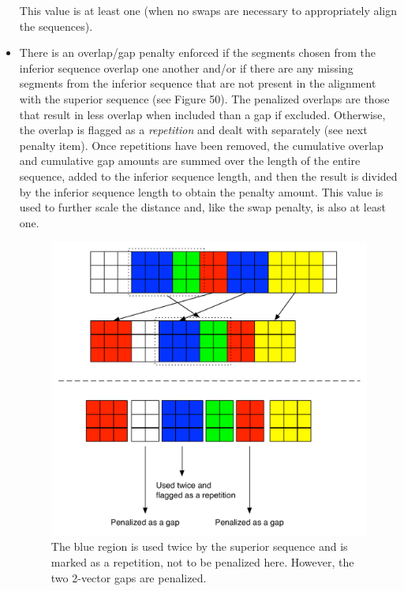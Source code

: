 \documentclass[12pt]{report} 	%
\numberwithin{figure}{chapter}
\numberwithin{table}{chapter}
\numberwithin{equation}{chapter}
\begin{document}
\begin{flushleft}
\begin{itemize}
\begin{figure}[h!]
\begin{center}
\end{center}
\end{figure}
This value is at least one (when no swaps are necessary to appropriately align the sequences). 
\item There is an overlap/gap penalty enforced if the segments chosen from the inferior sequence overlap one another and/or if there are any missing segments from the inferior sequence that are not present in the alignment with the superior sequence (see Figure 50). The penalized overlaps are those that result in less overlap when included than a gap if excluded. Otherwise, the overlap is flagged as a \textit{repetition} and dealt with separately (see next penalty item). Once repetitions have been removed, the cumulative overlap and cumulative gap amounts are summed over the length of the entire sequence, added to the inferior sequence length, and then the result is divided by the inferior sequence length to obtain the penalty amount. This value is used to further scale the distance and, like the swap penalty, is also at least one.
\begin{figure}[h!]
\begin{center}
\includegraphics[scale=0.7]{Penalty_2}
\caption[Penalizing overlaps and gaps]{The blue region is used twice by the superior sequence and is marked as a repetition, not to be penalized here. However, the two 2-vector gaps are penalized.}
\end{center}

\end{figure}
\end{itemize}
\end{flushleft}
\end{document}
